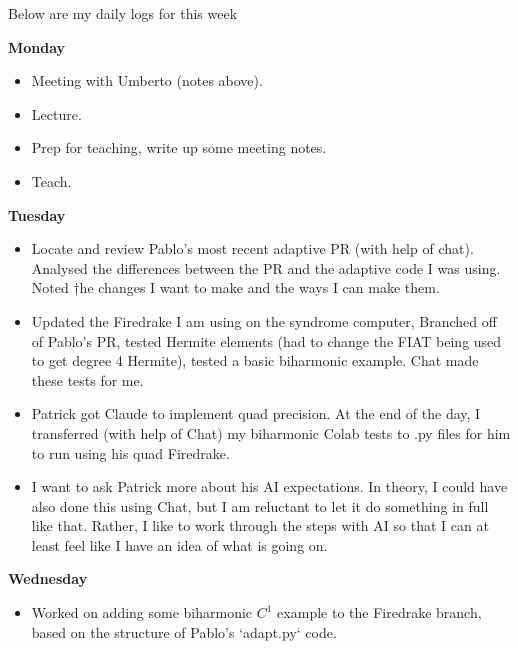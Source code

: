 \documentclass[12pt,a4paper]{article}
\begin{document}
Below are my daily logs for this week
\newline



\textbf{Monday}

\begin{itemize}
    \item  Meeting with Umberto (notes above). 
    \item Lecture.
    \item Prep for teaching, write up some meeting notes.
    \item Teach.
\end{itemize}

\textbf{Tuesday}

\begin{itemize}
\item Locate and review Pablo's most recent adaptive PR (with help of chat). Analysed the differences between the PR and the adaptive code I was using. Noted †he changes I want to make and the ways I can make them.
\item Updated the Firedrake I am using on the syndrome computer, Branched off of Pablo's PR, tested Hermite elements (had to change the FIAT being used to get degree 4 Hermite), tested a basic biharmonic example. Chat made these tests for me. 

\item Patrick got Claude to implement quad precision. At the end of the day, I transferred (with help of Chat) my biharmonic Colab tests to .py files for him to run using his quad Firedrake.

\item I want to ask Patrick more about his AI expectations. In theory, I could have also done this using Chat, but I am reluctant to let it do something in full like that. Rather, I like to work through the steps with AI so that I can at least feel like I have an idea of what is going on. 
\end{itemize}

\textbf{Wednesday}

\begin{itemize}
    \item Worked on adding some biharmonic $C^1$ example to the Firedrake branch, based on the structure of Pablo's `adapt.py` code.  
\end{itemize}
\end{document}
